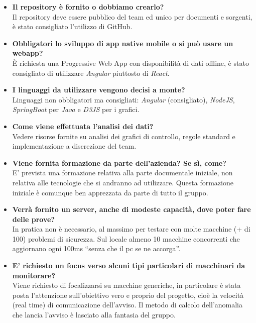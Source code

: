 \documentclass{classes/base}
\begin{document}
    \begin{itemize}
        \item  \textbf{Il repository è fornito o dobbiamo crearlo?}
        \\Il repository deve essere pubblico del team ed unico per documenti e sorgenti, è stato consigliato l'utilizzo di GitHub.
        \item  \textbf{Obbligatori lo sviluppo di app native mobile o si può usare un webapp?}
        \\È richiesta una Progressive Web App con disponibilità di dati offline, è stato consigliato di utilizzare \textit{Angular} piuttosto di \textit{React}.
        \item  \textbf{I linguaggi da utilizzare vengono decisi a monte?} 
        \\Linguaggi non obbligatori ma consigliati: \textit{Angular} (consigliato), \textit{NodeJS}, \textit{SpringBoot} per \textit{Java} e \textit{D3JS} per i grafici.
        \item  \textbf{Come viene effettuata l'analisi dei dati?}
        \\Vedere risorse fornite su analisi dei grafici di controllo, regole standard e implementazione a discrezione del team.
        \item  \textbf{Viene fornita formazione da parte dell'azienda? Se sì, come?}
        \\E’ prevista una formazione relativa alla parte documentale iniziale, non relativa alle tecnologie che si andranno ad utilizzare. Questa formazione iniziale è comunque ben apprezzata da parte di tutto il gruppo.
        \item  \textbf{Verrà fornito un server, anche di modeste capacità, dove poter fare delle prove?}
        \\In pratica non è necessario, al massimo per testare con molte macchine (+ di 100) problemi di sicurezza. Sul locale almeno 10 macchine concorrenti che aggiornano ogni 100ms “senza che il pc se ne accorga”.
        \item  \textbf{E' richiesto un focus verso alcuni tipi particolari di macchinari da monitorare?}
        \\Viene richiesto di focalizzarsi su macchine generiche, in particolare è stata posta l’attenzione sull’obiettivo vero e proprio del progetto, cioè la velocità (real time) di comunicazione dell’avviso. Il metodo di calcolo dell’anomalia che lancia l’avviso è lasciato alla fantasia del gruppo.
    \end{itemize}
\end{document}
